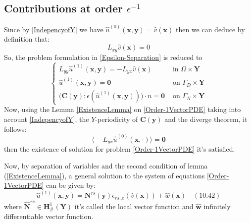\subsection{Contributions at order $\epsilon^{-1}$}
Since by \ref{IndepencyofY} we have $\hat{u}^{(0)}(\mathbf{x},\mathbf{y}) = \hat{v}(\mathbf{x})$ then we can deduce by definition that:
\begin{equation*}
    L_{xy} \hat{v}(\mathbf{x}) = 0
\end{equation*}
So, the problem formulation in \ref{Epsilon-Separation} is reduced to
\begin{equation*}
    \label{Order-1VectorPDE}
    \left \{
    \begin{array}{cc}
        L_{yy} \hat{u}^{(1)}(\mathbf{x},\mathbf{y}) = - L_{yx} \hat{v}(\mathbf{x}) & \text{ in } \Omega \times \mathbf{Y} \\
        \hat{u}^{(1)}(\mathbf{x},\mathbf{y}) = \mathbf{0} & \text{ on } \Gamma_D \times \mathbf{Y} \\
        \big( \mathbf{C}(\mathbf{y}) : \epsilon( \hat{u}^{(1)}(\mathbf{x},\mathbf{y})) \big) \cdot n = \mathbf{0} & \text{ on } \Gamma_N \times \mathbf{Y}
    \end{array}
    \right .
\end{equation*}
Now, using the Lemma \ref{ExistenceLemma} on \ref{Order-1VectorPDE} taking into account \ref{IndepencyofY}, the $Y$-periodicity of $\mathbf{C}(\mathbf{y})$ and the diverge theorem, it follows:
\begin{equation*}
    \big\langle - L_{yx} \hat{u}^{(0)}(\mathbf{x}, \cdot) \big\rangle = \mathbf{0}
\end{equation*}
then the existence of solution for problem \ref{Order-1VectorPDE} it's satisfied.

Now, by separation of variables and the second condition of lemma (\ref{ExistenceLemma}), a general solution to the system of equations \ref{Order-1VectorPDE} can be given by:
\begin{equation}
    \label{Order-1Ansatz}
    \hat{u}^{(1)}(\mathbf{x},\mathbf{y}) = \mathbf{N}^{rs}(\mathbf{y}) \epsilon_{rs,x}(\hat{v}(\mathbf{x})) + \hat{w}(\mathbf{x}) \quad (10.42)
\end{equation}
where $\hat{\mathbf{N}}^{rs} \in \mathbf{H}^1_{\#}(\mathbf{Y})$ it's called the local vector function and $\hat{\mathbf{w}}$ infinitely differentiable vector function.

